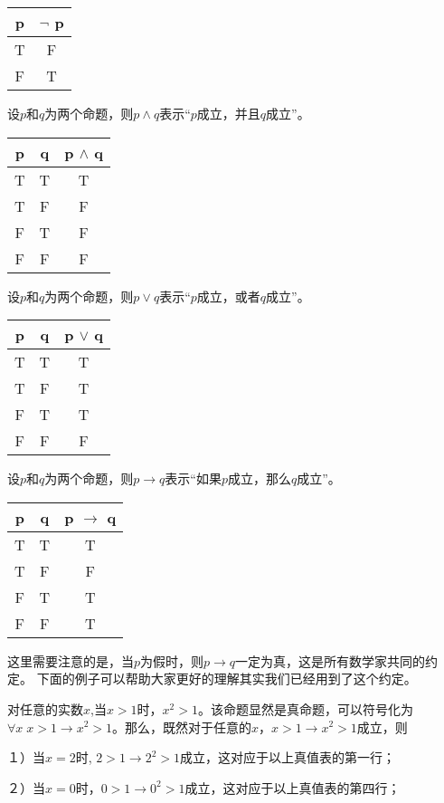 \documentclass{article}
\begin{document}
\begin{CJK}{UTF8}{gbsn}
 \begin{tabular}{c|c}
    p& $\lnot$ p\\
    \hline
    T&F\\
    F&T\\
  \end{tabular}

  设$p$和$q$为两个命题，则$p\land q$表示“$p$成立，并且$q$成立”。
  
  \begin{tabular}{cc|c}
    p& q& p $\land$ q\\
    \hline
    T&T&T\\
    T&F&F\\
    F&T&F\\
    F&F&F\\
  \end{tabular}

  设$p$和$q$为两个命题，则$p\lor q$表示“$p$成立，或者$q$成立”。
  
  \begin{tabular}{cc|c}
    p& q& p $\lor$ q\\
    \hline
    T&T&T\\
    T&F&T\\
    F&T&T\\
    F&F&F\\
  \end{tabular}

设$p$和$q$为两个命题，则$p\to q$表示“如果$p$成立，那么$q$成立”。  

    \begin{tabular}{cc|c}
    p& q& p $\to$ q\\
    \hline
    T&T&T\\
    T&F&F\\
    F&T&T\\
    F&F&T\\
    \end{tabular}\hspace{0.87cm}

    这里需要注意的是，当$p$为假时，则$p\to q$一定为真，这是所有数学家共同的约定。
    下面的例子可以帮助大家更好的理解其实我们已经用到了这个约定。

    对任意的实数$x$,当$x>1$时，$x^2 > 1$。该命题显然是真命题，可以符号化为$\forall x \; x > 1 \to x^2 > 1$。那么，既然对于任意的$x$，$x>1 \to x^2>1$成立，则

    １）当$x=2$时, $2 > 1 \to 2^2 >1$成立，这对应于以上真值表的第一行；

    ２）当$x=0$时，$0 > 1 \to 0^2 > 1$成立，这对应于以上真值表的第四行；


\end{CJK}
\end{document}

